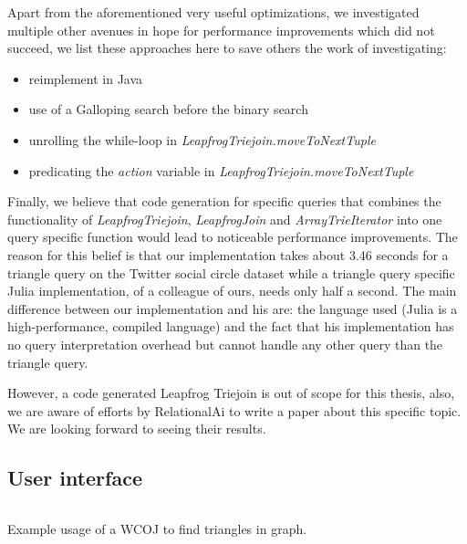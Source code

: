 Apart from the aforementioned very useful optimizations, we investigated multiple other avenues in hope for performance improvements
which did not succeed, we list these approaches here to save others the work of investigating:

\begin{itemize}
    \item reimplement in Java
    \item use of a Galloping search before the binary search
    \item unrolling the while-loop in \textit{LeapfrogTriejoin.moveToNextTuple}
    \item predicating the \textit{action} variable in \textit{LeapfrogTriejoin.moveToNextTuple}
\end{itemize}


Finally, we believe that code generation for specific queries that combines the functionality of \textit{LeapfrogTriejoin}, \textit{LeapfrogJoin}
and \textit{ArrayTrieIterator} into one query specific function would lead to noticeable performance improvements.
The reason for this belief is that our implementation takes about 3.46 seconds for a triangle query on the Twitter social circle dataset
while a triangle query specific Julia implementation, of a colleague of ours, needs only half a second.
The main difference between our implementation and his are: the language used (Julia is a high-performance, compiled language) and the fact
that his implementation has no query interpretation overhead but cannot handle any other query than the triangle query.

However, a code generated Leapfrog Triejoin is out of scope for this thesis, also, we are aware of efforts by RelationalAi to
write a paper about this specific topic.
We are looking forward to seeing their results.





\subsection{User interface}\label{ssec:user-interface}
\begin{listing}[H]
\inputminted{scala}{code/usage-example.scala}
\caption{Example usage of a WCOJ to find triangles in graph.}
\label{lst:usage-example}
\end{listing}

